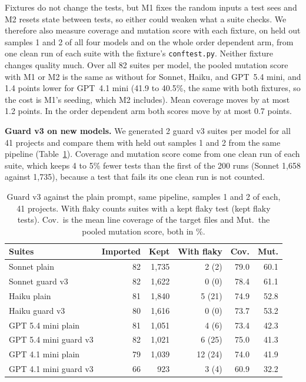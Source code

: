 Fixtures do not change the tests, but M1 fixes the random inputs a test sees and M2 resets state between tests, so either could weaken what a suite checks. We therefore also measure coverage and mutation score with each fixture, on held out samples 1 and 2 of all four models and on the whole order dependent arm, from one clean run of each suite with the fixture's \texttt{conftest.py}. Neither fixture changes quality much. Over all 82 suites per model, the pooled mutation score with M1 or M2 is the same as without for Sonnet, Haiku, and GPT~5.4 mini, and 1.4 points lower for GPT~4.1 mini (41.9 to 40.5\%, the same with both fixtures, so the cost is M1's seeding, which M2 includes). Mean coverage moves by at most 1.2 points. In the order dependent arm both scores move by at most 0.7 points.

\textbf{Guard v3 on new models.} We generated 2 guard v3 suites per model for all 41 projects and compare them with held out samples 1 and 2 from the same pipeline (Table~\ref{tab:guard3}). Coverage and mutation score come from one clean run of each suite, which keeps 4 to 5\% fewer tests than the first of the 200 runs (Sonnet 1,658 against 1,735), because a test that fails its one clean run is not counted.

\begin{table}[htbp]
\caption{Guard v3 against the plain prompt, same pipeline, samples 1 and 2 of each, 41 projects. With flaky counts suites with a kept flaky test (kept flaky tests). Cov.\ is the mean line coverage of the target files and Mut.\ the pooled mutation score, both in \%.}
\label{tab:guard3}
\small
\setlength{\tabcolsep}{2.5pt}
\begin{tabularx}{\columnwidth}{Xrrrrr}
\toprule
Suites & Imported & Kept & With flaky & Cov. & Mut. \\
\midrule
Sonnet plain & 82 & 1,735 & 2 (2) & 79.0 & 60.1 \\
Sonnet guard v3 & 82 & 1,622 & 0 (0) & 78.4 & 61.1 \\
Haiku plain & 81 & 1,840 & 5 (21) & 74.9 & 52.8 \\
Haiku guard v3 & 80 & 1,616 & 0 (0) & 73.7 & 53.2 \\
GPT 5.4 mini plain & 81 & 1,051 & 4 (6) & 73.4 & 42.3 \\
GPT 5.4 mini guard v3 & 82 & 1,021 & 6 (25) & 75.0 & 41.3 \\
GPT 4.1 mini plain & 79 & 1,039 & 12 (24) & 74.0 & 41.9 \\
GPT 4.1 mini guard v3 & 66 & 923 & 3 (4) & 60.9 & 32.2 \\
\bottomrule
\end{tabularx}
\end{table}

